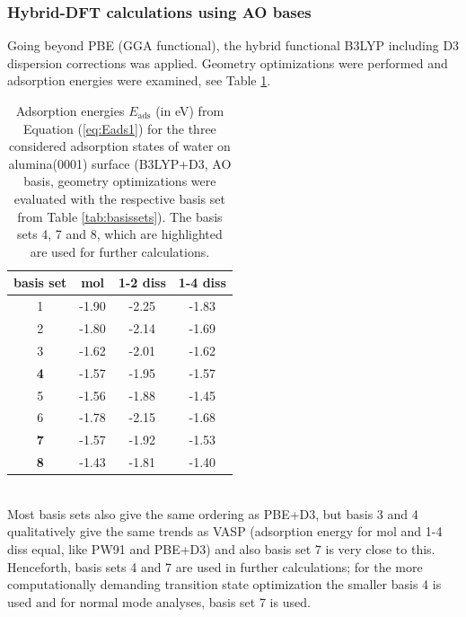 \documentclass[11pt,DIV=13,BCOR=5mm,a4paper,headinclude]{scrbook}
\begin{document}
\subsubsection{Hybrid-DFT calculations using AO bases}
Going beyond PBE (GGA functional), the hybrid functional B3LYP including D3 dispersion corrections was applied.
Geometry optimizations were performed and adsorption energies were examined, see Table \ref{tab:basisset-results-B3LYP+D3}.
 \begin{table}[!h]
  \centering
   \caption{Adsorption energies $E_\textrm{ads}$ (in eV) from Equation (\ref{eq:Eads1}) for the three considered adsorption states of water on alumina(0001) surface (B3LYP+D3, AO basis, geometry optimizations were evaluated with the respective basis set from Table \ref{tab:basissets}).
   The basis sets 4, 7 and 8, which are highlighted are used for further calculations.}
  \begin{tabular}{c|ccc}
  \toprule
  basis set & mol & 1-2 diss & 1-4 diss \\\midrule
  1 &-1.90 &-2.25 &-1.83 \\
  2 &-1.80 &-2.14 &-1.69 \\
  3 &-1.62 &-2.01 &-1.62 \\
  \textbf{4} &-1.57 &-1.95 &-1.57 \\
  5 &-1.56 &-1.88 &-1.45 \\
  6 &-1.78 &-2.15 &-1.68 \\
  \textbf{7} &-1.57 &-1.92 &-1.53 \\
  \textbf{8} &-1.43 &-1.81 &-1.40 \\\bottomrule
  \end{tabular}
  \label{tab:basisset-results-B3LYP+D3}
\end{table}
\\
Most basis sets also give the same ordering as PBE+D3, but basis 3 and 4 qualitatively give the same trends as VASP (adsorption energy for mol and 1-4 diss equal, like PW91 and PBE+D3) and also basis set 7 is very close to this.
Henceforth, basis sets 4 and 7 are used in further calculations; for the more computationally demanding transition state optimization the smaller basis 4 is used and for normal mode analyses, basis set 7 is used.



% 
\clearpage
\end{document}
